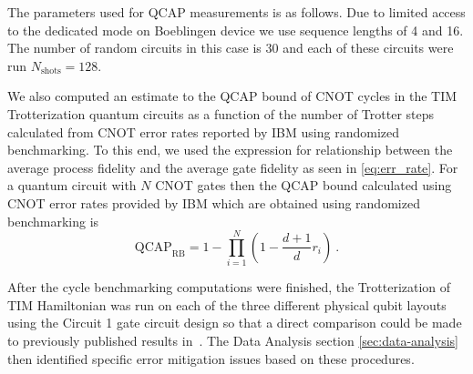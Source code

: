 The parameters used for QCAP measurements is as follows. Due to limited access to the dedicated mode on Boeblingen device we use sequence lengths of 4 and 16. The number of random circuits in this case is 30 and each of these circuits were run $N_{\text{shots}}=128$. 


We also computed an estimate to the QCAP bound of CNOT cycles in the TIM Trotterization quantum circuits as a function of the number of Trotter steps calculated from CNOT error rates reported by IBM using randomized benchmarking. To this end, we used the expression for relationship between the average process fidelity and the average gate fidelity as seen in \eqref{eq:err_rate}. For a quantum circuit with $N$ CNOT gates then the QCAP bound calculated using CNOT error rates provided by IBM which are obtained using randomized benchmarking is
\begin{equation}
    \text{QCAP}_{\text{RB}}=1-\prod_{i=1}^N\left(1-\frac{d+1}{d} r_i\right)~.\label{eq:QCAP_RB}
\end{equation}


After the cycle benchmarking computations were finished, the Trotterization of TIM Hamiltonian was run on each of the three different physical qubit layouts using the Circuit 1 gate circuit design so that a direct comparison could be made to previously published results in~\cite{GustafsonIsing}.  The Data Analysis section \ref{sec:data-analysis} then identified specific error mitigation issues based on these procedures.








